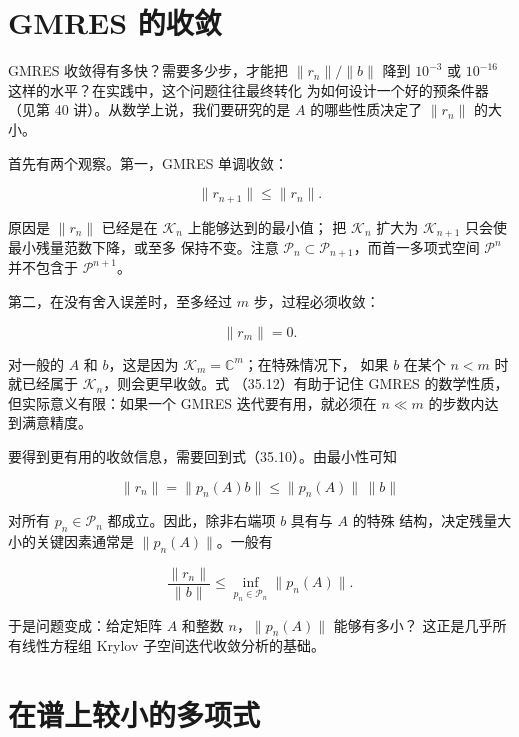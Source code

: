 \documentclass[UTF8,fontset=none,12pt]{ctexart}
\begin{document}
\section*{GMRES 的收敛}

GMRES 收敛得有多快？需要多少步，才能把 $\lVert r_n\rVert/\lVert b\rVert$
降到 $10^{-3}$ 或 $10^{-16}$ 这样的水平？在实践中，这个问题往往最终转化
为如何设计一个好的预条件器（见第 40 讲）。从数学上说，我们要研究的是
$A$ 的哪些性质决定了 $\lVert r_n\rVert$ 的大小。

首先有两个观察。第一，GMRES 单调收敛：

\begin{equation}
\lVert r_{n+1}\rVert\leq\lVert r_n\rVert.
\tag{35.11}
\end{equation}

原因是 $\lVert r_n\rVert$ 已经是在 $\mathcal K_n$ 上能够达到的最小值；
把 $\mathcal K_n$ 扩大为 $\mathcal K_{n+1}$ 只会使最小残量范数下降，或至多
保持不变。注意 $\mathcal P_n\subset\mathcal P_{n+1}$，而首一多项式空间
$\mathcal P^n$ 并不包含于 $\mathcal P^{n+1}$。

第二，在没有舍入误差时，至多经过 $m$ 步，过程必须收敛：

\begin{equation}
\lVert r_m\rVert=0.
\tag{35.12}
\end{equation}

对一般的 $A$ 和 $b$，这是因为 $\mathcal K_m=\mathbb C^m$；在特殊情况下，
如果 $b$ 在某个 $n<m$ 时就已经属于 $\mathcal K_n$，则会更早收敛。式
（35.12）有助于记住 GMRES 的数学性质，但实际意义有限：如果一个 GMRES
迭代要有用，就必须在 $n\ll m$ 的步数内达到满意精度。

要得到更有用的收敛信息，需要回到式（35.10）。由最小性可知

\[
\lVert r_n\rVert=\lVert p_n(A)b\rVert
\leq \lVert p_n(A)\rVert\,\lVert b\rVert
\]

对所有 $p_n\in\mathcal P_n$ 都成立。因此，除非右端项 $b$ 具有与 $A$ 的特殊
结构，决定残量大小的关键因素通常是 $\lVert p_n(A)\rVert$。一般有

\begin{equation}
\frac{\lVert r_n\rVert}{\lVert b\rVert}
\leq
\inf_{p_n\in\mathcal P_n}\lVert p_n(A)\rVert.
\tag{35.13}
\end{equation}

于是问题变成：给定矩阵 $A$ 和整数 $n$，$\lVert p_n(A)\rVert$ 能够有多小？
这正是几乎所有线性方程组 Krylov 子空间迭代收敛分析的基础。

\section*{在谱上较小的多项式}
\end{document}
